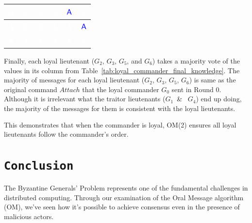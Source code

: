 \documentclass[11pt]{article}
\newcommand{\cmdA}{\ensuremath{\mathsf{A}}} %
\newcommand{\gen}[1]{\ensuremath{G_{#1}}}
\begin{document}
\begin{center}
\begin{tabular}{c|c|c|c|c|c}
    \hline
    \cellcolor{blue!75}\textbf{\textcolor{white}{A}} & \cellcolor{blue!75}\textbf{\textcolor{white}{A}} & \cellcolor{blue!75}\textbf{\textcolor{white}{A}} & \cellcolor{blue!75}\textbf{\textcolor{white}{A}} & \cellcolor{yellow!30}\textbf{\textcolor{blue}{\cmdA}} & \cellcolor{blue!75}\textbf{\textcolor{white}{A}} \\
    \hline
    \cellcolor{blue!75}\textbf{\textcolor{white}{A}} & \cellcolor{blue!75}\textbf{\textcolor{white}{A}} & \cellcolor{blue!75}\textbf{\textcolor{white}{A}} & \cellcolor{blue!75}\textbf{\textcolor{white}{A}} & \cellcolor{blue!75}\textbf{\textcolor{white}{A}} & \cellcolor{yellow!30}\textbf{\textcolor{blue}{\cmdA}} \\
    \hline
    \hline
    \cellcolor{blue!45}\textbf{\textcolor{white}{A}} & \cellcolor{blue!75}\textbf{\textcolor{white}{A}} & \cellcolor{blue!75}\textbf{\textcolor{white}{A}} & \cellcolor{blue!45}\textbf{\textcolor{white}{A}} & \cellcolor{blue!75}\textbf{\textcolor{white}{A}} & \cellcolor{blue!75}\textbf{\textcolor{white}{A}} \\
\end{tabular}
\label{tab:loyal_commander_final_knowledge}
\end{center}

\justifying
Finally, each loyal lieutenant ($\gen{2}$, $\gen{3}$, $\gen{5}$, and $\gen{6}$) takes a majority vote of the values in its column from Table~\ref{tab:loyal_commander_final_knowledge}. The majority of messages for each loyal lieutenant (\gen{2}, \gen{3}, \gen{5}, \gen{6}) is same as the original command $Attach$ that the loyal commander \gen{0} sent in Round 0. Although it is irrelevant what the traitor lieutenants (\gen{1}\ \& \ \gen{4}) end up doing, the majority of the messages for them is consistent with the loyal lieutenants.

This demonstrates that when the commander is loyal, OM(2) ensures all loyal lieutenants follow the commander's order.

\section*{\texttt{\Large Conclusion}}

\justifying
The Byzantine Generals' Problem represents one of the fundamental challenges in distributed computing. Through our examination of the Oral Message algorithm (OM), we've seen how it's possible to achieve consensus even in the presence of malicious actors.
\end{document}
